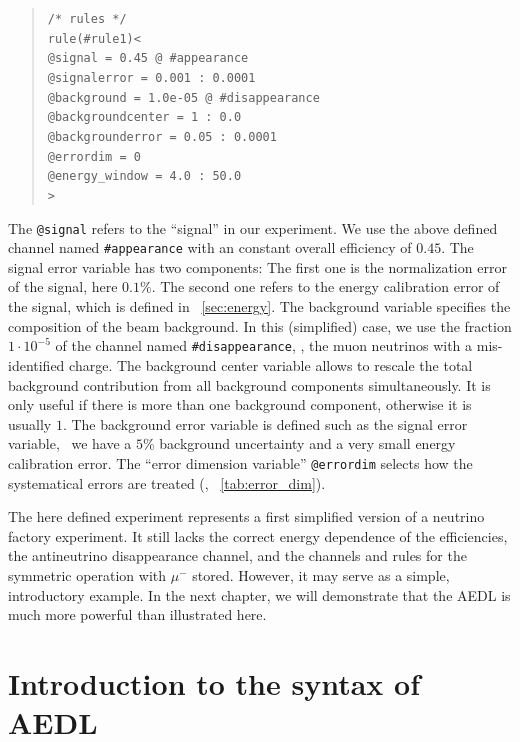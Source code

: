 \begin{quote}
{\tt /* rules */}\\
{\tt rule(\#rule1)<}\\
{\tt \tb @signal = 0.45 @ \#appearance}\\
{\tt \tb @signalerror = 0.001 : 0.0001}\\
{\tt \tb @background = 1.0e-05 @ \#disappearance}\\
{\tt \tb @backgroundcenter = 1 : 0.0}\\
{\tt \tb @backgrounderror = 0.05 : 0.0001}\\
{\tt \tb @errordim = 0}\\
{\tt \tb @energy\_window = 4.0 : 50.0}\\
{\tt >}
\end{quote}
The {\tt @signal} refers to the ``signal'' in our experiment. We use the
above defined channel named {\tt \#appearance} with an constant overall
efficiency of $0.45$. The signal error variable has two components: 
The first one is the normalization error of the signal, here $0.1\%$. The second 
one refers to the energy calibration error of the signal, which is defined 
in \Sec~\ref{sec:energy}. The background variable
specifies the composition of the beam background. In this (simplified) case, we
use the fraction $1\cdot 10^{-5}$ of the channel named {\tt \#disappearance}, \ie , the muon neutrinos with a mis-identified charge. The background center variable allows to rescale the total background contribution from all background components
simultaneously. It is only useful if there is more than one background component, otherwise it is usually $1$. The background error variable is defined such as the signal error variable, \ie\ we have a $5\%$ background uncertainty and a very small energy calibration error. The ``error dimension variable'' {\tt @errordim} selects how the systematical errors are treated (\cf, \Tab~\ref{tab:error_dim}). 

The here defined experiment represents a first simplified version of a neutrino factory experiment. It still lacks the correct energy dependence of the efficiencies, the antineutrino disappearance channel, and the channels and rules for the symmetric operation with $\mu^-$ stored. However, it may serve as a simple, introductory example. In the next chapter, we will demonstrate that the AEDL is much more powerful than illustrated here.


\section{Introduction to the syntax of AEDL}
\label{sec:syntax}

